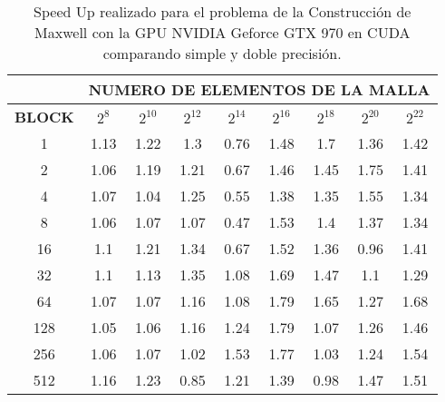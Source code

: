 \begin{table}[h!]
\centering
    \begin{tabular}{|c|c|c|c|c|c|c|c|c|}
    \hline
                   & \multicolumn{8}{c|}{\textbf{NUMERO DE ELEMENTOS DE LA MALLA}} \\ \hline
    \textbf{BLOCK} & $2^{8}$ & $2^{10}$& $2^{12}$& $2^{14}$& $2^{16}$& $2^{18}$& $2^{20}$& $2^{22}$\\ \hline
    1              & 1.13  & 1.22  & 1.3   & 0.76  & 1.48  & 1.7   & 1.36  & 1.42  \\ \hline
    2              & 1.06  & 1.19  & 1.21  & 0.67  & 1.46  & 1.45  & 1.75  & 1.41  \\ \hline
    4              & 1.07  & 1.04  & 1.25  & 0.55  & 1.38  & 1.35  & 1.55  & 1.34  \\ \hline
    8              & 1.06  & 1.07  & 1.07  & 0.47  & 1.53  & 1.4   & 1.37  & 1.34  \\ \hline
    16             & 1.1   & 1.21  & 1.34  & 0.67  & 1.52  & 1.36  & 0.96  & 1.41  \\ \hline
    32             & 1.1   & 1.13  & 1.35  & 1.08  & 1.69  & 1.47  & 1.1   & 1.29  \\ \hline
    64             & 1.07  & 1.07  & 1.16  & 1.08  & 1.79  & 1.65  & 1.27  & 1.68  \\ \hline
    128            & 1.05  & 1.06  & 1.16  & 1.24  & 1.79  & 1.07  & 1.26  & 1.46  \\ \hline
    256            & 1.06  & 1.07  & 1.02  & 1.53  & 1.77  & 1.03  & 1.24  & 1.54  \\ \hline
    512            & 1.16  & 1.23  & 0.85  & 1.21  & 1.39  & 0.98  & 1.47  & 1.51  \\ \hline
    \end{tabular}
    \caption{Speed Up realizado para el problema de la Construcción de Maxwell con la GPU NVIDIA Geforce GTX 970 en CUDA comparando simple y doble precisión.}
    \label{tab:c_970_MxC_cuda_10}
    \end{table}